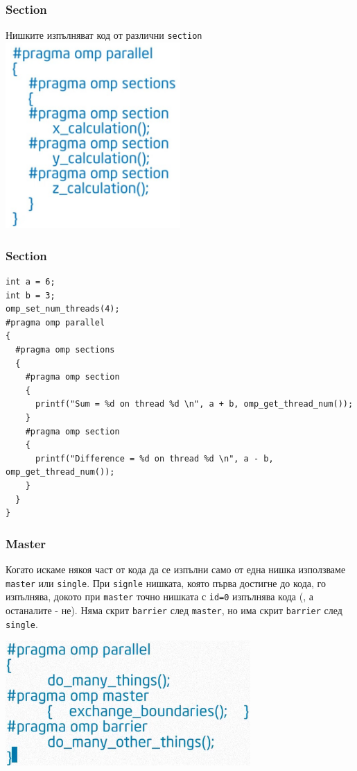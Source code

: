 \documentclass{beamer}
\begin{document}
\begin{frame}
  \frametitle{Section}
  Нишките изпълняват код от различни \texttt{section}
  \centering
  \includegraphics[width=0.5\textwidth]{section}
\end{frame}

\begin{frame}[fragile]
  \frametitle{Section}

\scriptsize
\lstset{language=C++}
\begin{lstlisting}
int a = 6;
int b = 3;
omp_set_num_threads(4);
#pragma omp parallel
{
  #pragma omp sections
  {
    #pragma omp section
    {
      printf("Sum = %d on thread %d \n", a + b, omp_get_thread_num());
    }
    #pragma omp section 
    {
      printf("Difference = %d on thread %d \n", a - b, omp_get_thread_num());
    }
  }
}
\end{lstlisting}

\end{frame}


\begin{frame}
  \frametitle{Master}

  Когато искаме някоя част от кода да се изпълни само от една нишка използваме \texttt{master} или \texttt{single}. При \texttt{signle} нишката, която първа достигне до кода, го изпълнява, докото при \texttt{master} точно нишката с \texttt{id=0} изпълнява кода (, а останалите - не). Няма скрит \texttt{barrier} след \texttt{master}, но има скрит \texttt{barrier} след \texttt{single}.

  \centering
  \includegraphics[width=0.7\textwidth]{master}
\end{frame}
\end{document}

